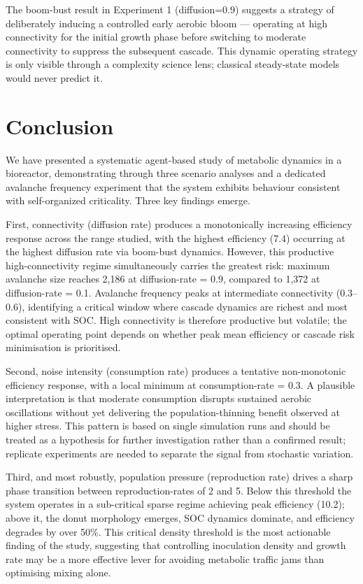 \documentclass[12pt]{article}
\begin{document}
The boom-bust result in Experiment 1 (diffusion=0.9) suggests a strategy of deliberately inducing a controlled early aerobic bloom --- operating at high connectivity for the initial growth phase before switching to moderate connectivity to suppress the subsequent cascade. This dynamic operating strategy is only visible through a complexity science lens; classical steady-state models would never predict it.

\section{Conclusion}

We have presented a systematic agent-based study of metabolic dynamics in a 
bioreactor, demonstrating through three scenario analyses and a dedicated 
avalanche frequency experiment that the system exhibits behaviour consistent 
with self-organized criticality. Three key findings emerge.

First, connectivity (diffusion rate) produces a monotonically increasing 
efficiency response across the range studied, with the highest efficiency 
(7.4) occurring at the highest diffusion rate via boom-bust dynamics. However, 
this productive high-connectivity regime simultaneously carries the greatest 
risk: maximum avalanche size reaches 2,186 at diffusion-rate = 0.9, compared 
to 1,372 at diffusion-rate = 0.1. Avalanche frequency peaks at intermediate 
connectivity (0.3--0.6), identifying a critical window where cascade dynamics 
are richest and most consistent with SOC. High connectivity is therefore 
productive but volatile; the optimal operating point depends on whether 
peak mean efficiency or cascade risk minimisation is prioritised.

Second, noise intensity (consumption rate) produces a tentative non-monotonic 
efficiency response, with a local minimum at consumption-rate = 0.3. A 
plausible interpretation is that moderate consumption disrupts sustained 
aerobic oscillations without yet delivering the population-thinning benefit 
observed at higher stress. This pattern is based on single simulation runs 
and should be treated as a hypothesis for further investigation rather than 
a confirmed result; replicate experiments are needed to separate the signal 
from stochastic variation.

Third, and most robustly, population pressure (reproduction rate) drives a 
sharp phase transition between reproduction-rates of 2 and 5. Below this 
threshold the system operates in a sub-critical sparse regime achieving peak 
efficiency (10.2); above it, the donut morphology emerges, SOC dynamics 
dominate, and efficiency degrades by over 50\%. This critical density 
threshold is the most actionable finding of the study, suggesting that 
controlling inoculation density and growth rate may be a more effective 
lever for avoiding metabolic traffic jams than optimising mixing alone.
\end{document}
